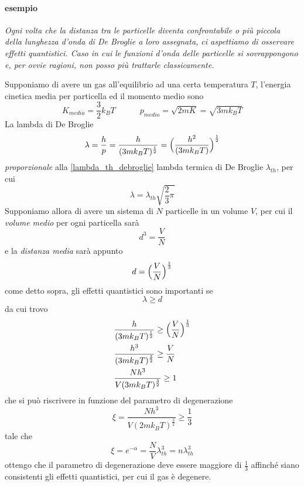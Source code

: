 \paragraph{esempio}
\textit{Ogni volta che la distanza tra le particelle diventa confrontabile o più piccola della lunghezza d'onda di De Broglie a loro assegnata, ci aspettiamo di osservare effetti quantistici. Caso in cui le funzioni d'onda delle particelle si sovrappongono e, per ovvie ragioni, non posso più trattarle classicamente.}

Supponiamo di avere un gas all'equilibrio ad una certa temperatura $T$, l'energia cinetica media per particella ed il momento medio sono
\begin{equation}
K_{media} = \frac{3}{2} k_B T
\quad\quad\quad
p_{medio} = \sqrt{2mK} = \sqrt{3 m k_B T}
\end{equation}
La lambda di De Broglie
\begin{equation}
\lambda = \frac{h}{p} 
= \frac{h}{(3mk_B T)^{ \frac{1}{2} }}
= \Bigl(  \frac{h^2}{(3mk_B T)}  \Bigr)^{ \frac{1}{2} }
\end{equation}
\textit{proporzionale} alla \ref{lambda_th_debroglie} lambda termica di De Broglie $\lambda_{th}$, per cui
\begin{equation}
\lambda = \lambda_{th} \sqrt{\frac{2}{3}\pi} 
\end{equation}
Supponiamo allora di avere un sistema di $N$ particelle in un volume $V$, per cui il \textit{volume medio} per ogni particella sarà
\begin{equation}
d^3 = \frac{V}{N}
\end{equation}
e la \textit{distanza media} sarà appunto
\begin{equation}
d = \Bigl(   \frac{V}{N}  \Bigr)^{\frac{1}{3}}
\end{equation}
come detto sopra, gli effetti quantistici sono importanti se
\begin{equation}
\lambda \ge d
\end{equation}
da cui trovo
\begin{equation}
\begin{split}
& \frac{h}{(3mk_B T)^{ \frac{1}{2} }} \ge \Bigl(   \frac{V}{N}  \Bigr)^{\frac{1}{3}} \\
& \frac{h^3}{(3mk_B T)^{ \frac{3}{2} }} \ge \frac{V}{N}  \\
& \frac{N h^3}{V(3mk_B T)^{ \frac{3}{2} }} \ge 1 
\end{split}
\end{equation}
che si può riscrivere in funzione del parametro di degenerazione
\begin{equation}
\xi = \frac{N h^3}{V(2mk_B T)^{ \frac{3}{2} }} \ge \frac{1}{3} 
\end{equation}
tale che 
\begin{equation}
\xi = e^{ -\alpha } =\frac{N}{V} \lambda_{th}^3 = n \lambda_{th}^3
\end{equation}
ottengo che il parametro di degenerazione deve essere maggiore di $\frac{1}{3}$ affinché siano consistenti gli effetti quantistici, per cui il gas è degenere.

